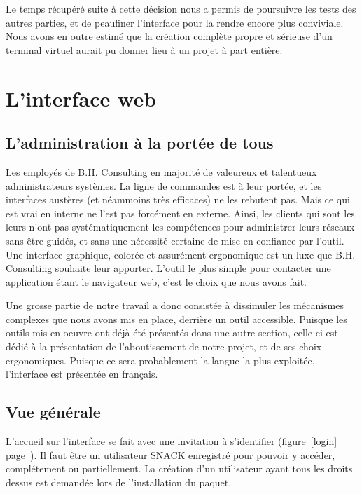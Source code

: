 Le temps récupéré suite à cette décision nous a permis de poursuivre les tests des autres parties, et de peaufiner l'interface pour la rendre encore plus conviviale. Nous avons en outre estimé que la création complète propre et sérieuse d'un terminal virtuel aurait pu donner lieu à un projet à part entière.

\section{L'interface web}
\subsection{L'administration à la portée de tous}

Les employés de B.H. Consulting en majorité de valeureux et talentueux administrateurs systèmes. La ligne de commandes est à leur portée, et les interfaces austères (et néammoins très efficaces) ne les rebutent pas. Mais ce qui est vrai en interne ne l'est pas forcément en externe. Ainsi, les clients qui sont les leurs n'ont pas systématiquement les compétences pour administrer leurs réseaux sans être guidés, et sans une nécessité certaine de mise en confiance par l'outil. Une interface graphique, colorée et assurément ergonomique est un luxe que B.H. Consulting souhaite leur apporter. L'outil le plus simple pour contacter une application étant le navigateur web, c'est le choix que nous avons fait.

Une grosse partie de notre travail a donc consistée à dissimuler les mécanismes complexes que nous avons mis en place, derrière un outil accessible. Puisque les outils mis en oeuvre ont déjà été présentés dans une autre section, celle-ci est dédié à la présentation de l'aboutissement de notre projet, et de ses choix ergonomiques. Puisque ce sera probablement la langue la plus exploitée, l'interface est présentée en français.

\subsection{Vue générale}

L'accueil sur l'interface se fait avec une invitation à s'identifier (figure~\ref{login} page~\pageref{login}). Il faut être un utilisateur SNACK enregistré pour pouvoir y accéder, complétement ou partiellement. La création d'un utilisateur ayant tous les droits dessus est demandée lors de l'installation du paquet.

